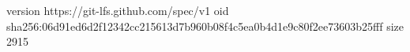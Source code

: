 version https://git-lfs.github.com/spec/v1
oid sha256:06d91ed6d2f12342cc215613d7b960b08f4c5ea0b4d1e9c80f2ee73603b25fff
size 2915
